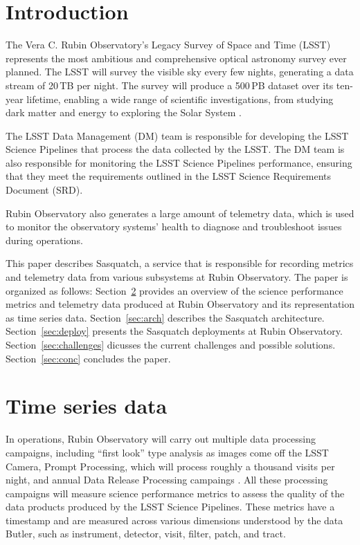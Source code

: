 
\section{Introduction}

The Vera C. Rubin Observatory's Legacy Survey of Space and Time (LSST) represents the most ambitious and comprehensive optical astronomy survey ever planned. The LSST will survey the visible sky every few nights, generating a data stream of 20\,TB per night. The survey will produce a 500\,PB dataset over its ten-year lifetime, enabling a wide range of scientific investigations, from studying dark matter and energy to exploring the Solar System \cite{2019ApJ...873..111I}.

The LSST Data Management (DM) team is responsible for developing the LSST Science Pipelines that process the data collected by the LSST. The DM team is also responsible for monitoring the LSST Science Pipelines performance, ensuring that they meet the requirements outlined in the LSST Science Requirements Document (SRD). \cite{LPM-17}

Rubin Observatory also generates a large amount of telemetry data, which is used to monitor the observatory systems' health to diagnose and troubleshoot issues during operations.

This paper describes Sasquatch, a service that is responsible for recording metrics and telemetry data from various subsystems at Rubin Observatory. The paper is organized as follows: Section~\ref{sec:tsd} provides an overview of the science performance metrics and telemetry data produced at Rubin Observatory and its representation as time series data. Section~\ref{sec:arch} describes the Sasquatch architecture. Section~\ref{sec:deploy} presents the Sasquatch deployments at Rubin Observatory. Section~\ref{sec:challenges} dicusses the current challenges and possible solutions. Section~\ref{sec:conc} concludes the paper.

\section{Time series data}
\label{sec:tsd}

In operations, Rubin Observatory will carry out multiple data processing campaigns, including ``first look'' type analysis as images come off the LSST Camera, Prompt Processing, which will process roughly a thousand visits per night, and annual Data Release Processing campaings \cite{LSE-163}. All these processing campaigns will measure science performance metrics to assess the quality of the data products produced by the LSST Science Pipelines. \cite{2019ASPC..523..521B,2022SPIE12189E..0MG} These metrics have a timestamp and are measured across various dimensions understood by the data Butler,\cite{2022SPIE12189E..11J} such as instrument, detector, visit, filter, patch, and tract.

